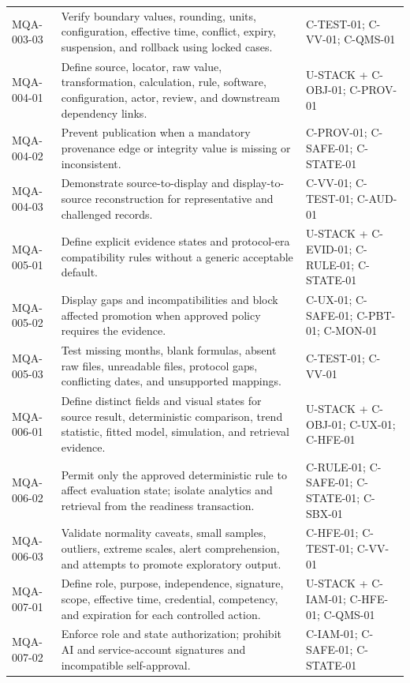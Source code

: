 \documentclass[11pt,letterpaper]{article}
\begin{document}
\begin{scriptsize}
\begin{longtable}{@{}L{0.13\textwidth}L{0.48\textwidth}L{0.31\textwidth}@{}}
MQA-003-03 & Verify boundary values, rounding, units, configuration, effective time, conflict, expiry, suspension, and rollback using locked cases. & C-TEST-01; C-VV-01; C-QMS-01 \\
\addlinespace[3pt]
MQA-004-01 & Define source, locator, raw value, transformation, calculation, rule, software, configuration, actor, review, and downstream dependency links. & U-STACK + C-OBJ-01; C-PROV-01 \\
MQA-004-02 & Prevent publication when a mandatory provenance edge or integrity value is missing or inconsistent. & C-PROV-01; C-SAFE-01; C-STATE-01 \\
MQA-004-03 & Demonstrate source-to-display and display-to-source reconstruction for representative and challenged records. & C-VV-01; C-TEST-01; C-AUD-01 \\
\addlinespace[3pt]
MQA-005-01 & Define explicit evidence states and protocol-era compatibility rules without a generic acceptable default. & U-STACK + C-EVID-01; C-RULE-01; C-STATE-01 \\
MQA-005-02 & Display gaps and incompatibilities and block affected promotion when approved policy requires the evidence. & C-UX-01; C-SAFE-01; C-PBT-01; C-MON-01 \\
MQA-005-03 & Test missing months, blank formulas, absent raw files, unreadable files, protocol gaps, conflicting dates, and unsupported mappings. & C-TEST-01; C-VV-01 \\
\addlinespace[3pt]
MQA-006-01 & Define distinct fields and visual states for source result, deterministic comparison, trend statistic, fitted model, simulation, and retrieval evidence. & U-STACK + C-OBJ-01; C-UX-01; C-HFE-01 \\
MQA-006-02 & Permit only the approved deterministic rule to affect evaluation state; isolate analytics and retrieval from the readiness transaction. & C-RULE-01; C-SAFE-01; C-STATE-01; C-SBX-01 \\
MQA-006-03 & Validate normality caveats, small samples, outliers, extreme scales, alert comprehension, and attempts to promote exploratory output. & C-HFE-01; C-TEST-01; C-VV-01 \\
\addlinespace[3pt]
MQA-007-01 & Define role, purpose, independence, signature, scope, effective time, credential, competency, and expiration for each controlled action. & U-STACK + C-IAM-01; C-HFE-01; C-QMS-01 \\
MQA-007-02 & Enforce role and state authorization; prohibit AI and service-account signatures and incompatible self-approval. & C-IAM-01; C-SAFE-01; C-STATE-01 \\

\end{longtable}
\end{scriptsize}
\end{document}
